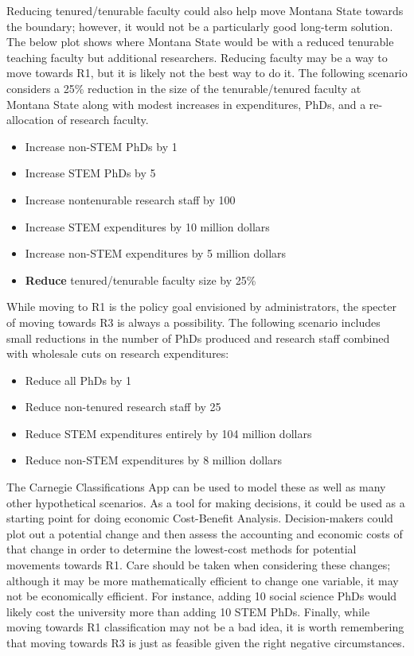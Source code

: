 \documentclass{article}
\begin{document}
 
 Reducing tenured/tenurable faculty could also help move Montana State towards the boundary; however, it would not be a particularly good long-term solution. The below plot shows where Montana State would be with a reduced tenurable teaching faculty but additional researchers. Reducing faculty may be a way to move towards R1, but it is likely not the best way to do it.  The following scenario considers a 25\% reduction in the size of the tenurable/tenured faculty at Montana State along with modest increases in expenditures, PhDs, and a re-allocation of research faculty. \\
\begin{itemize}
 \item Increase non-STEM PhDs by 1
 \item Increase STEM PhDs by 5
 \item Increase nontenurable research staff by 100
 \item Increase STEM expenditures by 10 million dollars
 \item Increase non-STEM expenditures by 5 million dollars
 \item \textbf{Reduce} tenured/tenurable faculty size by 25\%
\end{itemize}
 

  
  While moving to R1 is the policy goal envisioned by administrators, the specter of moving towards R3 is always a possibility. The following scenario includes small reductions in the number of PhDs produced and research staff combined with wholesale cuts on research expenditures: \\
  \begin{itemize}
  \item Reduce all PhDs by 1 
  \item Reduce non-tenured research staff by 25
  \item Reduce STEM expenditures entirely by 104 million dollars
  \item Reduce non-STEM expenditures by 8 million dollars
    \end{itemize}

  
  The Carnegie Classifications App can be used to model these as well as many other hypothetical scenarios. As a tool for making decisions, it could be used as a starting point for doing economic Cost-Benefit Analysis. Decision-makers could plot out a potential change and then assess the accounting and economic costs of that change in order to determine the lowest-cost methods for potential movements towards R1. Care should be taken when considering these changes; although it may be more mathematically efficient to change one variable, it may not be economically efficient. For instance, adding 10 social science PhDs would likely cost the university more than adding 10 STEM PhDs. Finally, while moving towards R1 classification may not be a bad idea, it is worth remembering that moving towards R3 is just as feasible given the right negative circumstances. 
  
\end{document}
